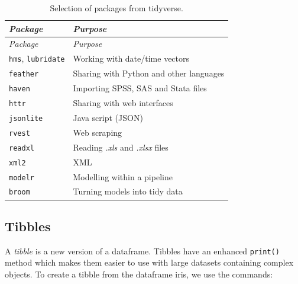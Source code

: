 \documentclass[
]{book}
\begin{document}
\begin{longtable}[]{@{}
  >{\raggedright\arraybackslash}p{}
  >{\raggedright\arraybackslash}p{}@{}}
\caption{\label{tab:TidyverseOther} Selection of packages from tidyverse.}\tabularnewline
\toprule\noalign{}
\begin{minipage}[b]{\linewidth}\raggedright
\emph{{Package}}
\end{minipage} & \begin{minipage}[b]{\linewidth}\raggedright
\emph{{Purpose}}
\end{minipage} \\
\midrule\noalign{}
\endfirsthead
\toprule\noalign{}
\begin{minipage}[b]{\linewidth}\raggedright
\emph{{Package}}
\end{minipage} & \begin{minipage}[b]{\linewidth}\raggedright
\emph{{Purpose}}
\end{minipage} \\
\midrule\noalign{}
\endhead
\bottomrule\noalign{}
\endlastfoot
\texttt{hms}, \texttt{lubridate} & Working with date/time vectors \\
\texttt{feather} & Sharing with Python and other languages \\
\texttt{haven} & Importing SPSS, SAS and Stata files \\
\texttt{httr} & Sharing with web interfaces \\
\texttt{jsonlite} & Java script (JSON) \\
\texttt{rvest} & Web scraping \\
\texttt{readxl} & Reading \emph{{.xls}} and \emph{{.xlsx}} files \\
\texttt{xml2} & XML \\
\texttt{modelr} & Modelling within a pipeline \\
\texttt{broom} & Turning models into tidy data \\
\end{longtable}

\subsection{Tibbles}\label{tibbles}

A \emph{{tibble}} is a new version of a dataframe. Tibbles have an enhanced \texttt{print()} method which makes them easier to use with large datasets containing complex objects. To create a tibble from the dataframe iris, we use the commands:
\end{document}
